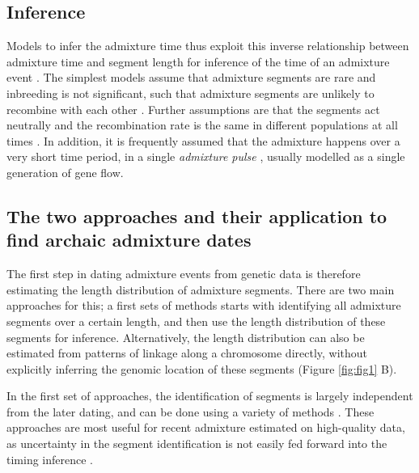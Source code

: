 \documentclass[]{article}
\begin{document}
\subsection{Inference}
Models to infer the admixture time thus exploit this inverse relationship between admixture time and segment length for inference of the time of an admixture event \citep{moorjani_history_2011,pugach_dating_2011,sankararaman_date_2012,loh_inferring_2013,sankararaman_combined_2016,pugach_gateway_2018,jacobs_multiple_2019,hellenthal_genetic_2014,pool_inference_2009,moorjani_history_2011,gravel_population_2012,liang_lengths_2014}. The simplest models assume that admixture segments are rare and inbreeding is not significant, such that admixture segments are unlikely to recombine with each other \citep{pool_inference_2009,liang_lengths_2014}. Further assumptions are that the segments act neutrally \citep{shchur_distribution_2019} and the recombination rate is the same in different populations at all times \citep{gravel_population_2012}. In addition, it is frequently assumed that the admixture happens over a very short time period, in a single \textit{admixture pulse} \citep{moorjani_history_2011}, usually modelled as a single generation of gene flow.


\subsection{The two approaches and their application to find archaic admixture dates}\label{the-two-approaches-and-their-application-to-find-archaic-admixture-dates}

The first step in dating admixture events from genetic data is therefore estimating the length distribution of admixture segments.  There are two main approaches for this; a first sets of methods starts with identifying all admixture segments over a certain length, and then use the length distribution of these segments for inference. Alternatively, the length distribution can also be estimated from patterns of linkage along a chromosome directly, without explicitly inferring the genomic location of these segments \citep{chimusa_dating_2018} (Figure \ref{fig:fig1} B).

 In the first set of approaches, the identification of segments is largely independent from the later dating, and can be done using a variety of methods \citep{seguin_orlando_paleogenomics_2014,vernot_excavating_2016,sankararaman_combined_2016,racimo_signatures_2017,skov_detecting_2018}. These approaches are most useful for recent admixture estimated on high-quality data, as uncertainty in the segment identification is not easily fed forward into the timing inference \citep{hellenthal_genetic_2014}.
\end{document}
